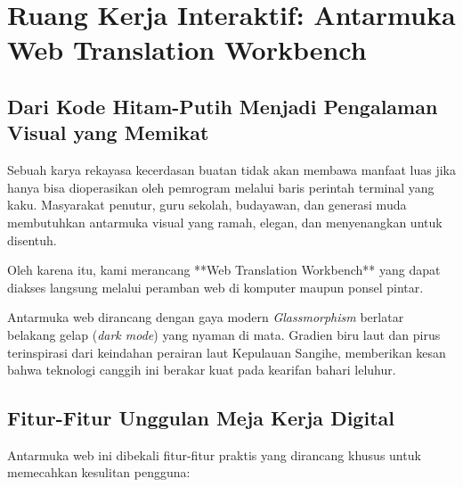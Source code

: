 \chapter{Ruang Kerja Interaktif: Antarmuka Web Translation Workbench}

\section{Dari Kode Hitam-Putih Menjadi Pengalaman Visual yang Memikat}
Sebuah karya rekayasa kecerdasan buatan tidak akan membawa manfaat luas jika hanya bisa dioperasikan oleh pemrogram melalui baris perintah terminal yang kaku. Masyarakat penutur, guru sekolah, budayawan, dan generasi muda membutuhkan antarmuka visual yang ramah, elegan, dan menyenangkan untuk disentuh.

Oleh karena itu, kami merancang **Web Translation Workbench** yang dapat diakses langsung melalui peramban web di komputer maupun ponsel pintar.

\begin{infobox}
Antarmuka web dirancang dengan gaya modern \textit{Glassmorphism} berlatar belakang gelap (\textit{dark mode}) yang nyaman di mata. Gradien biru laut dan pirus terinspirasi dari keindahan perairan laut Kepulauan Sangihe, memberikan kesan bahwa teknologi canggih ini berakar kuat pada kearifan bahari leluhur.
\end{infobox}

\section{Fitur-Fitur Unggulan Meja Kerja Digital}
Antarmuka web ini dibekali fitur-fitur praktis yang dirancang khusus untuk memecahkan kesulitan pengguna:


